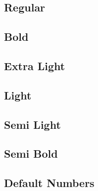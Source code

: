 \documentclass{article}
\begin{document}
\renewcommand*\familydefault{\ttdefault}
\ttfamily 
\subsection*{Regular}
\lipsum[1]

\subsection*{Bold}
\textbf{\lipsum[2]}

\subsection*{Extra Light}
{\ttfamily {}\selectfont\lipsum[5]}

\subsection*{Light}
{\ttfamily {}\selectfont\lipsum[5]}

\subsection*{Semi Light}
{\ttfamily {}\selectfont\lipsum[5]}

\subsection*{Semi Bold}
{\ttfamily {}\selectfont\lipsum[6]}


\subsection*{Default Numbers}

\end{document}
